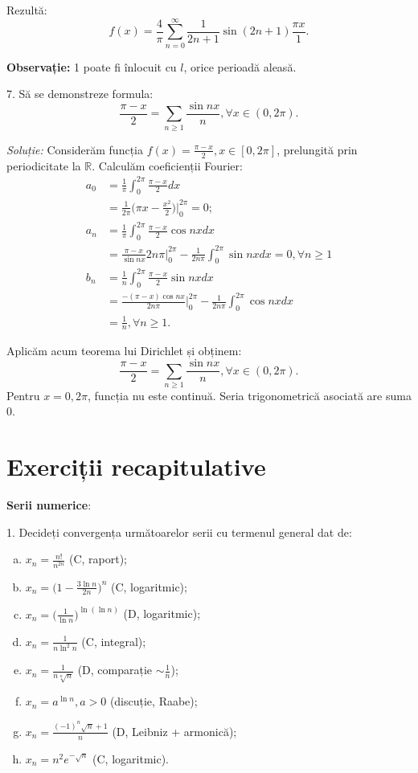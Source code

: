 \documentclass[11pt,a4paper]{article}
\newcommand\RR{\mathbb{R}}
\theoremstyle{dotless}
\theoremstyle{dotlessdr}
\begin{document}
Rezultă:
\[
  f(x) = \frac{4}{\pi} \sum_{n = 0}^\infty \frac{1}{2n + 1} \sin(2n + 1) \frac{\pi x}{1}.
\]

\textbf{Observație:} 1 poate fi înlocuit cu $l$, orice perioadă aleasă.

\vspace{1cm}

7. Să se demonstreze formula:
\[
  \frac{\pi - x}{2} = \sum_{n \geq 1} \frac{\sin nx}{n}, \forall x \in (0, 2\pi).
\]

\emph{Soluție:} Considerăm funcția $f(x) = \frac{\pi - x}{2}, x \in [0, 2\pi]$,
prelungită prin periodicitate la $\RR$. Calculăm coeficienții Fourier:
\begin{align*}
  a_0 &= \frac{1}{\pi} \int_0^{2 \pi} \frac{\pi - x}{2} dx \\
      &= \frac{1}{2\pi} \Big( \pi x - \frac{x^2}{2} \Big) \Big|_0^{2 \pi} = 0; \\
  a_n &= \frac{1}{\pi} \int_0^{2\pi} \frac{\pi - x}{2} \cos nx dx \\
      &= \frac{\pi - x}{\sin nx} 2n\pi \Big|_0^{2 \pi} -
        \frac{1}{2n \pi} \int_0^{2\pi} \sin nx dx = 0, \forall n \geq 1 \\
  b_n &= \frac{1}{n} \int_0^{2\pi} \frac{\pi - x}{2} \sin nx dx \\
      &= \frac{-(\pi - x) \cos nx}{2n \pi} \Big|_0^{2\pi} -
        \frac{1}{2n\pi} \int_0^{2\pi} \cos nx dx \\
      &= \frac{1}{n}, \forall n \geq 1.
\end{align*}

Aplicăm acum teorema lui Dirichlet și obținem:
\[
  \frac{\pi - x}{2} = \sum_{n \geq 1} \frac{\sin nx}{n}, \forall x \in (0, 2\pi).
\]
Pentru $x = 0, 2\pi$, funcția nu este continuă. Seria trigonometrică
asociată are suma 0.



\section{Exerciții recapitulative}
\label{sec:recap}

\textbf{Serii numerice}:

1. Decideți convergența următoarelor serii cu termenul general dat de:
\begin{enumerate}[(a)]
\item $x_n = \frac{n!}{n^{2n}}$ \hfill (C, raport);
\item $x_n = \Big( 1 - \frac{3 \ln n}{2n} \Big)^n$ \hfill(C, logaritmic);
\item $x_n = \Big( \frac{1}{\ln n} \Big)^{\ln(\ln n)}$ \hfill(D, logaritmic);
\item $x_n = \frac{1}{n \ln^2 n}$ \hfill (C, integral);
\item $x_n = \frac{1}{n \sqrt[n]{n}}$ \hfill (D, comparație $\sim \frac{1}{n}$);
\item $x_n = a^{\ln n}, a > 0$ \hfill (discuție, Raabe);
\item $x_n = \frac{(-1)^n \sqrt{n} + 1}{n}$ \hfill (D, Leibniz + armonică);
\item $x_n = n^2 e^{-\sqrt{n}}$ \hfill (C, logaritmic).
\end{enumerate}
\end{document}
